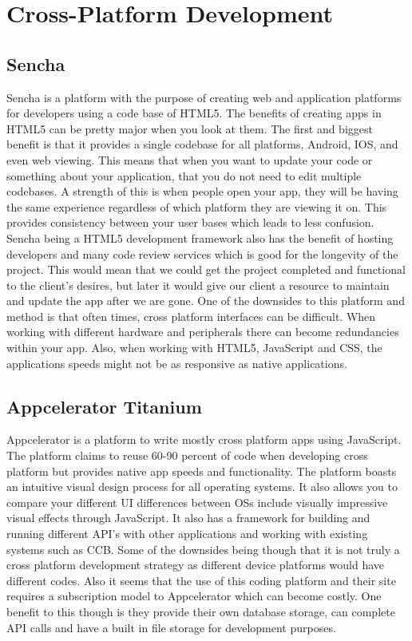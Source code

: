 \documentclass[letterpaper,10pt,draftclsnofoot,onecolumn,titlepage]{IEEEtran}
\begin{document}
	\section{Cross-Platform Development}
	\subsection{Sencha}
		Sencha is a platform with the purpose of creating web and application platforms for developers using a code base of HTML5. The benefits of creating apps in HTML5 can be pretty major when you look at them. The first and biggest benefit is that it provides a single codebase for all platforms, Android, IOS, and even web viewing. This means that when you want to update your code or something about your application, that you do not need to edit multiple codebases. A strength of this is when people open your app, they will be having the same experience regardless of which platform they are viewing it on. This provides consistency between your user bases which leads to less confusion. Sencha being a HTML5 development framework also has the benefit of hosting developers and many code review services which is good for the longevity of the project. This would mean that we could get the project completed and functional to the client’s desires, but later it would give our client a resource to maintain and update the app after we are gone. One of the downsides to this platform and method is that often times, cross platform interfaces can be difficult. When working with different hardware and peripherals there can become redundancies within your app. Also, when working with HTML5, JavaScript and CSS, the applications speeds might not be as responsive as native applications.
	\subsection{Appcelerator Titanium}
		Appcelerator is a platform to write mostly cross platform apps using JavaScript. The platform claims to reuse 60-90 percent of code when developing cross platform but provides native app speeds and functionality. The platform boasts an intuitive visual design process for all operating systems. It also allows you to compare your different UI differences between OSs include visually impressive visual effects through JavaScript.  It also has a framework for building and running different API’s with other applications and working with existing systems such as CCB. Some of the downsides being though that it is not truly a cross platform development strategy as different device platforms would have different codes. Also it seems that the use of this coding platform and their site requires a subscription model to Appcelerator which can become costly. One benefit to this though is they provide their own database storage, can complete API calls and have a built in file storage for development purposes. 
\end{document}
